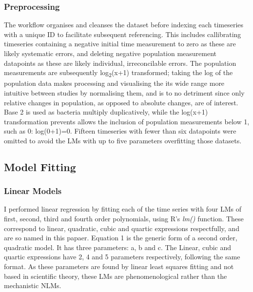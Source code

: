 \documentclass[11pt]{article}
\begin{document}
\subsubsection{Preprocessing}
The workflow organises and cleanses the dataset before indexing each timeseries with a unique ID to facilitate subsequent referencing. This includes callibrating timeseries containing a negative initial time measurement to zero as these are likely systematic errors, and deleting negative population measurement datapoints as these are likely individual, irreconcilable errors. The population measurements are subsequently log\textsubscript{2}(x+1) transformed; taking the log of the population data makes processing and visualising the its wide range more intuitive between studies by normalising them, and is to no detriment since only relative changes in population, as opposed to absolute changes, are of interest. Base 2 is used as bacteria multiply duplicatively, while the log(x+1) transformation prevents allows the inclusion of population measurements below 1, such as 0: log(0+1)=0. Fifteen timeseries with fewer than six datapoints were omitted to avoid the LMs with up to five parameters overfitting those datasets.



\subsection{Model Fitting}

\subsubsection{Linear Models}
I performed linear regression by fitting each of the time series with four LMs of first, second, third and fourth order polynomials, using R's \textit{lm()} function. These correspond to linear, quadratic, cubic and quartic expressions respectfully, and are so named in this papaer. Equation 1 is the generic form of a second order, quadratic model. It has three parameters: a, b and c. The Linear, cubic and quartic expressions have 2, 4 and 5 parameters respectively, following the same format. As these parameters are found by linear least squares fitting and not based in scientific theory, these LMs are phenomenological rather than the mechanistic NLMs. 
\end{document}
